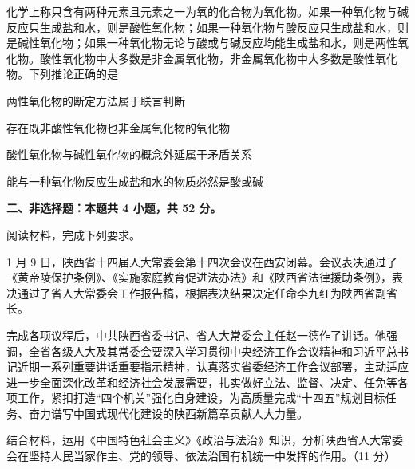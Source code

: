\documentclass{exam-zh}
\newenvironment{kaiti-indented}{
  \parindent=2em
  \CJKfamily{zhkai}
  \setstretch{1.4}
}{
}
\begin{document}
\begin{question}
  化学上称只含有两种元素且元素之一为氧的化合物为氧化物。如果一种氧化物与碱反应只生成盐和水，则是酸性氧化物；如果一种氧化物与酸反应只生成盐和水，则是碱性氧化物；如果一种氧化物无论与酸或与碱反应均能生成盐和水，则是两性氧化物。酸性氧化物中大多数是非金属氧化物，非金属氧化物中大多数是酸性氧化物。下列推论正确的是

   两性氧化物的断定方法属于联言判断

   存在既非酸性氧化物也非金属氧化物的氧化物

   酸性氧化物与碱性氧化物的概念外延属于矛盾关系

   能与一种氧化物反应生成盐和水的物质必然是酸或碱

  \begin{choices}
  \item {}
  \item {}
  \item {}
  \item {}
  \end{choices}
\end{question}

\begin{flushleft}
  {\bfseries 二、非选择题：本题共 4 小题，共 52 分。}
\end{flushleft}

\begin{question}
  阅读材料，完成下列要求。

  \begin{kaiti-indented}
    1 月 9 日，陕西省十四届人大常委会第十四次会议在西安闭幕。会议表决通过了《黄帝陵保护条例》、《实施家庭教育促进法办法》和《陕西省法律援助条例》，表决通过了省人大常委会工作报告稿，根据表决结果决定任命李九红为陕西省副省长。

    完成各项议程后，中共陕西省委书记、省人大常委会主任赵一德作了讲话。他强调，全省各级人大及其常委会要深入学习贯彻中央经济工作会议精神和习近平总书记近期一系列重要讲话重要指示精神，认真落实省委经济工作会议部署，主动适应进一步全面深化改革和经济社会发展需要，扎实做好立法、监督、决定、任免等各项工作，紧扣打造“四个机关”强化自身建设，为高质量完成“十四五”规划目标任务、奋力谱写中国式现代化建设的陕西新篇章贡献人大力量。
  \end{kaiti-indented}

  结合材料，运用《中国特色社会主义》《政治与法治》知识，分析陕西省人大常委会在坚持人民当家作主、党的领导、依法治国有机统一中发挥的作用。（11 分）
\end{question}
\end{document}
